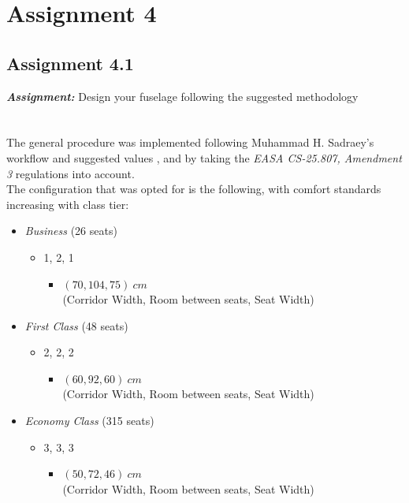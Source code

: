 \documentclass{article}
\begin{document}
\clearpage

\section{Assignment 4\label{Assignment_4}}

\subsection{Assignment 4.1\label{Assignment_4.1}}

\textbf{\textit{Assignment:}} Design your fuselage following the suggested methodology\\ \\ \\ 

The general procedure was implemented following Muhammad H. Sadraey's workflow and suggested values \autocite{Sadraey_Mohammad},
and by taking the \textit{EASA CS-25.807, Amendment 3} \autocite{EASA_CS25} regulations into account.\\ 

The configuration that was opted for is the following, with comfort standards increasing with class tier: 
\begin{itemize}
    \item \textit{Business} (26 seats)
        \begin{itemize}
            \item 1, 2, 1
            \begin{itemize}
                \item $\left ( 70, 104, 75 \right ) \ cm$ \\ (Corridor Width, Room between seats, Seat Width)
            \end{itemize}
        \end{itemize}
    \item \textit{First Class} (48 seats)
        \begin{itemize}
            \item 2, 2, 2
            \begin{itemize}
                \item $\left ( 60, 92, 60 \right ) \ cm$ \\ (Corridor Width, Room between seats, Seat Width)
            \end{itemize}
        \end{itemize}
    \item \textit{Economy Class} (315 seats)
        \begin{itemize}
            \item 3, 3, 3
            \begin{itemize}
                \item $\left ( 50, 72, 46 \right ) \ cm$ \\ (Corridor Width, Room between seats, Seat Width)
            \end{itemize}
        \end{itemize}
\end{itemize}
\clearpage
\end{document}
